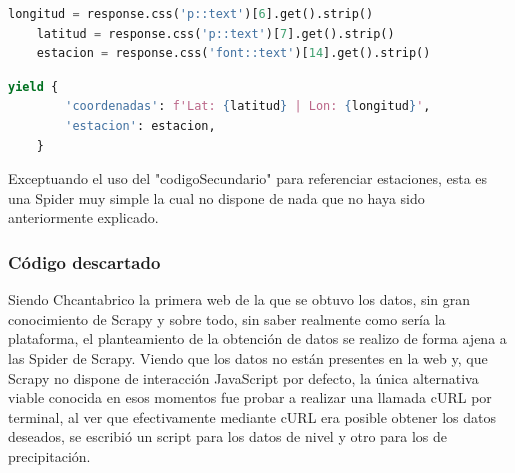 \begin{lstlisting}[language=Python, caption={Chcantabrico Coordinates Spider}]
	longitud = response.css('p::text')[6].get().strip()
	latitud = response.css('p::text')[7].get().strip()
	estacion = response.css('font::text')[14].get().strip()
\end{lstlisting}

\begin{lstlisting}[language=Python, caption={Chcantabrico Coordinates Spider}]
	yield {
		'coordenadas': f'Lat: {latitud} | Lon: {longitud}',
		'estacion': estacion,
	}
\end{lstlisting}

Exceptuando el uso del "codigoSecundario" para referenciar estaciones, esta es una Spider muy simple la cual no dispone de nada que no haya sido anteriormente explicado.

\subsubsection{Código descartado}
Siendo Chcantabrico la primera web de la que se obtuvo los datos, sin gran conocimiento de Scrapy y sobre todo, sin saber realmente como sería la plataforma, el planteamiento de la obtención de datos se realizo de forma ajena a las Spider de Scrapy.\newline
\newline
Viendo que los datos no están presentes en la web y, que Scrapy no dispone de interacción JavaScript por defecto, la única alternativa viable conocida en esos momentos fue probar a realizar una llamada cURL por terminal, al ver que efectivamente mediante cURL era posible obtener los datos deseados, se escribió un script para los datos de nivel y otro para los de precipitación.

